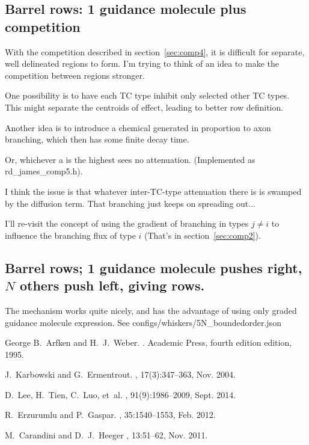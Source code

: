 \documentclass[11pt, a4paper]{article}
\makeatletter
\DeclareRobustCommand{\selectlanguage}[1]{%
  \@ifundefined{alias@\string#1}
    {\ORIGselectlanguage{#1}}
    {\begingroup\edef\x{\endgroup
       \noexpand\ORIGselectlanguage{\@nameuse{alias@#1}}}\x}%
}
\newcommand{\code}[1]{\textsf{#1}}
\makeatother
\begin{document}
\subsection{Barrel rows: 1 guidance molecule plus competition}

With the competition described in section~\ref{sec:comp4}, it is
difficult for separate, well delineated regions to form. I'm trying to
think of an idea to make the competition between regions stronger.

One possibility is to have each TC type inhibit only selected other TC
types. This might separate the centroids of effect, leading to better
row definition.

Another idea is to introduce a chemical generated in proportion to
axon branching, which then has some finite decay time.

Or, whichever a is the highest sees no attenuation. (Implemented
as \code{rd\_james\_comp5.h}).

I think the issue is that whatever inter-TC-type attenuation there is
is swamped by the diffusion term. That branching just keeps on
spreading out...

I'll re-visit the concept of using the gradient of branching in types $j \ne i$
to influence the branching flux of type $i$ (That's in section~\ref{sec:comp2}).

\subsection{Barrel rows; 1 guidance molecule pushes right, $N$ others
push left, giving rows.}

The mechanism works quite nicely, and has the advantage of using only
graded guidance molecule expression.
See \code{configs/whiskers/5N\_boundedorder.json}
%
%
\selectlanguage{English}

%
\begin{thebibliography}{1}

{George B.~Arfken} and H.~J.~Weber.
.
\newblock Academic Press, fourth edition edition, 1995.

J.~Karbowski and G.~Ermentrout.
, 17(3):347--363, Nov.
  2004.

D.~Lee, H.~Tien, C.~Luo, et~al.
,
  91(9):1986--2009, Sept. 2014.

R.~Erzurumlu and P.~Gaspar.
,
  35:1540--1553, Feb. 2012.

M.~Carandini and D.~J.~Heeger
,
  13:51--62, Nov. 2011.

\end{thebibliography}

\end{document}
